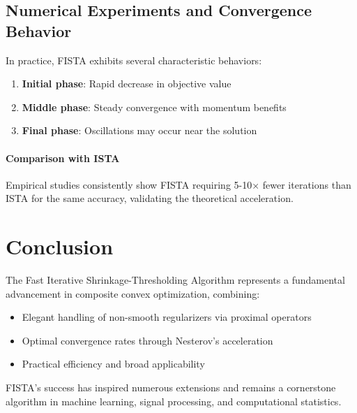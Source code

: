 \documentclass[12pt]{article}
\begin{document}
\subsection{Numerical Experiments and Convergence Behavior}

In practice, FISTA exhibits several characteristic behaviors:
\begin{enumerate}
    \item \textbf{Initial phase}: Rapid decrease in objective value
    \item \textbf{Middle phase}: Steady convergence with momentum benefits
    \item \textbf{Final phase}: Oscillations may occur near the solution
\end{enumerate}

\paragraph{Comparison with ISTA}
Empirical studies consistently show FISTA requiring 5-10× fewer iterations than ISTA for the same accuracy, validating the theoretical acceleration.

\section*{Conclusion}

The Fast Iterative Shrinkage-Thresholding Algorithm represents a fundamental advancement in composite convex optimization, combining:
\begin{itemize}
    \item Elegant handling of non-smooth regularizers via proximal operators
    \item Optimal convergence rates through Nesterov's acceleration
    \item Practical efficiency and broad applicability
\end{itemize}

FISTA's success has inspired numerous extensions and remains a cornerstone algorithm in machine learning, signal processing, and computational statistics.
\end{document}
